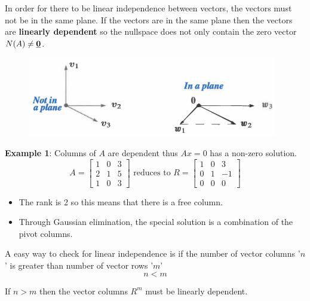 \documentclass[10pt,a4paper]{article}
\begin{document}
In order for there to be linear independence between vectors, the vectors must not be in the same
plane. If the vectors are in the same plane then the vectors are \textbf{linearly dependent} so the
nullspace does not only contain the zero vector $N(A)\neq \textbf{\underbar 0}$. 
\begin{figure} [h!]
    \centering
    \includegraphics[scale=0.9]{Independence.JPG}
\end{figure}

\textbf{Example 1}: Columns of $A$ are dependent thus $Ax=0$ has a non-zero solution. 
\begin{equation*} 
    A=\begin{bmatrix}
        1 & 0 & 3\\ 
        2 & 1 & 5\\ 
        1 & 0 & 3
        \end{bmatrix} \textrm{ reduces to } R=\begin{bmatrix}
            1 & 0 & 3\\ 
            0 & 1 & -1\\ 
            0 & 0 & 0
            \end{bmatrix}
\end{equation*}
\begin{itemize}
    \item The rank is 2 so this means that there is a free column.
    \item Through Gaussian elimination, the special solution is a combination of the pivot columns.
\end{itemize}

\begin{tcolorbox}[breakable,colback=white]
    A easy way to check for linear independence is if the number of vector columns '$n$' is greater than
    number of vector rows '$m$'
    $$
        n<m
    $$
    
    If $n>m$ then the vector columns $R^m$ must be linearly dependent.
\end{tcolorbox}
\pagebreak

\end{document}
